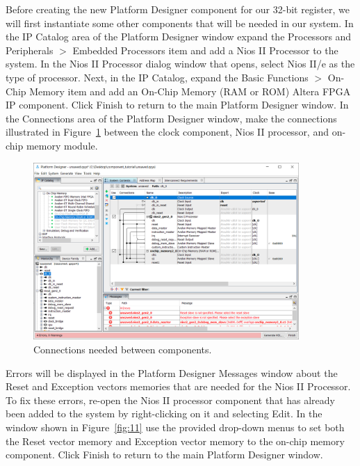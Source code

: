\documentclass[11pt, twoside, pdftex]{article}
\begin{document}
Before creating the new Platform Designer component for our 32-bit register, we will 
first instantiate some other components that will be needed in our system. In the {\sf IP Catalog} area of the Platform Designer window expand the
{\sf Processors and Peripherals $>$ Embedded Processors} item and add a {\sf Nios II Processor} to the system. In the Nios II
Processor dialog window that opens, select {\sf Nios II/e} as the type of processor. 
Next, in the {\sf IP Catalog}, expand the {\sf Basic Functions $>$ On-Chip Memory} item
and add an {\sf On-Chip Memory (RAM or ROM) Altera FPGA IP} component.
Click {\sf Finish} to return to the main Platform Designer window. In the {\sf Connections} area of the Platform Designer
window, make the connections illustrated in Figure~\ref{fig:10} between 
the clock component, Nios II processor, and on-chip memory module. 

\begin{figure}[H]
   \begin{center}
        \includegraphics[width=0.9\textwidth]{figures/figure10.png}
   \end{center}
   \caption{Connections needed between components.}
	\label{fig:10}
\end{figure}

\newpage
Errors will be displayed in the Platform Designer {\sf Messages} window about the Reset and Exception
vectors memories that are needed for the Nios II Processor. To fix these errors, re-open the
Nios II processor component that has already been added to the system by right-clicking on it and selecting {\sf Edit}.
In the window shown in Figure~\ref{fig:11} use the provided drop-down menus to set both
the Reset vector memory and Exception vector memory to the on-chip memory component.
Click {\sf Finish} to return to the main Platform Designer window.
\end{document}

